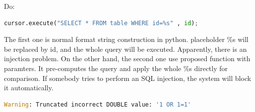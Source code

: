 \documentclass[conference]{IEEEtran}
\begin{document}
Do:
\begin{lstlisting}[language=python]
cursor.execute("SELECT * FROM table WHERE id=%s" , id);
\end{lstlisting}
The first one is normal format string construction in python.
placeholder \%s will be replaced by id,
and the whole query will be executed.
Apparently, there is an injection problem.
On the other hand,
the second one use proposed function with paramters.
It pre-computes the query and apply the whole \%s directly for comparison.
If somebody tries to perform an SQL injection, the system will block it automatically.
\begin{lstlisting}[language=python]
Warning: Truncated incorrect DOUBLE value: '1 OR 1=1'
\end{lstlisting}





\end{document}

